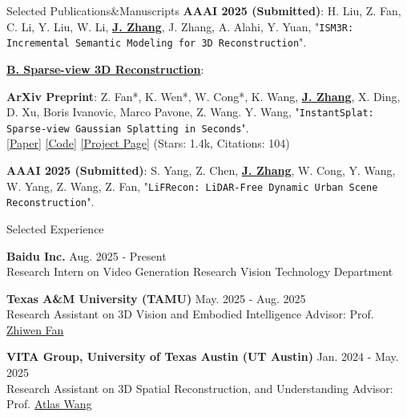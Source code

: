 \documentclass{resume} %
\begin{document}
\begin{rSection}{Selected Publications\&Manuscripts}
{ {\bf AAAI 2025 (Submitted)}}:
H. Liu, Z. Fan, C. Li, Y. Liu, W. Li, \underline{\textbf{J. Zhang}}, J. Zhang, A. Alahi, Y. Yuan,
 "{\texttt{ISM3R: Incremental Semantic Modeling for 3D Reconstruction}}".
\vspace{-1mm}

\textbf{\underline{B. Sparse-view 3D Reconstruction}}:

{ {\bf ArXiv Preprint}}:
Z. Fan*, K. Wen*, W. Cong*, K. Wang, \underline{\textbf{J. Zhang}}, X. Ding, 
D. Xu, Boris Ivanovic, Marco Pavone, Z. Wang. Y. Wang,
 "{\texttt{InstantSplat: Sparse-view Gaussian Splatting in Seconds}}".
\\ \hspace{1em} {\color{BlueViolet} \href{https://arxiv.org/abs/2403.20309}{[\underline{Paper}]} \hspace{1em} \href{https://github.com/NVlabs/InstantSplat}{[\underline{Code}]} \hspace{1em} \href{https://instantsplat.github.io/}{[\underline{Project Page}]}} \hspace{1em} (Stars: 1.4k, Citations: 104)
\vspace{-1mm}

{ {\bf AAAI 2025 (Submitted)}}:
S. Yang, Z. Chen, \underline{\textbf{J. Zhang}}, W. Cong, Y. Wang, W. Yang, Z. Wang, Z. Fan,
 "{\texttt{LiFRecon: LiDAR-Free Dynamic Urban Scene Reconstruction}}".
\vspace{-1mm}
 
\vspace{-1mm}
\end{rSection}

\begin{rSection}{Selected Experience}

\vspace{-0mm}
{ {\bf Baidu Inc.}} \hfill  Aug. 2025 - Present
\\Research Intern on Video Generation Research \hfill Vision Technology Department

\vspace{-0.5mm}

{ {\bf Texas A\&M University (TAMU)}} \hfill  May. 2025 - Aug. 2025
\\Research Assistant on 3D Vision and Embodied Intelligence \hfill Advisor: Prof. {\color{BlueViolet} \href{https://zhiwenfan.github.io/}{Zhiwen Fan}}

\vspace{-0.5mm}

{ {\bf VITA Group, University of Texas Austin (UT Austin)}
} \hfill  Jan. 2024 - May. 2025
\\Research Assistant on 3D Spatial Reconstruction, and Understanding \hfill Advisor: Prof. {\color{BlueViolet} \href{https://vita-group.github.io/group.html}{Atlas Wang}}

\end{rSection}
\end{document}
